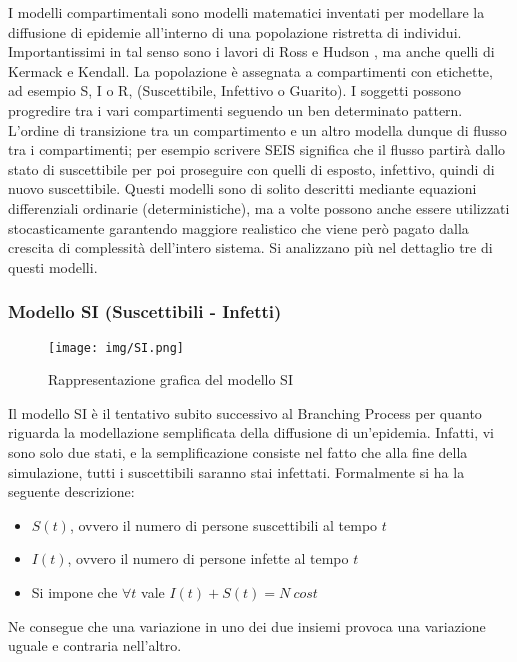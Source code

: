 \documentclass[12pt,twoside]{report}
\begin{document}
I modelli compartimentali sono modelli matematici inventati per modellare la diffusione di epidemie all'interno di una popolazione ristretta di individui. Importantissimi in tal senso sono i lavori di Ross e Hudson \cite{RossAnAO1}\cite{RossAnAO2}\cite{RossAnAO3}, ma anche quelli di Kermack\cite{KermackACT} e Kendall\cite{Kendall1956DeterministicAS}.
La popolazione è assegnata a compartimenti con etichette, ad esempio S, I o R, (Suscettibile, Infettivo o Guarito). I soggetti possono progredire tra i vari compartimenti seguendo un ben determinato pattern. L'ordine di transizione tra un compartimento e un altro modella dunque di flusso tra i compartimenti; per esempio scrivere SEIS significa che il flusso partirà dallo stato di suscettibile per poi proseguire con quelli di esposto, infettivo, quindi di nuovo suscettibile. Questi modelli sono di solito descritti mediante equazioni differenziali ordinarie (deterministiche), ma a volte possono anche essere utilizzati stocasticamente garantendo maggiore realistico che viene però pagato dalla crescita di complessità dell'intero sistema. Si analizzano più nel dettaglio tre di questi modelli.

\subsubsection{Modello SI (Suscettibili - Infetti)}
\begin{figure}[h]
		\centering
		\texttt{[image: img/SI.png]}
		\caption{Rappresentazione grafica del modello SI}\label{fig:1}
	\end{figure}
	
	Il modello SI è il tentativo subito successivo al Branching Process per quanto riguarda la modellazione semplificata della diffusione di un'epidemia. Infatti, vi sono solo due stati, e la semplificazione consiste nel fatto che alla fine della simulazione, tutti i suscettibili saranno stai infettati.
	Formalmente si ha la seguente descrizione:
	
	\begin{itemize}
	    \item $S(t)$, ovvero il numero di persone suscettibili al tempo $t$
	    \item $I(t)$, ovvero il numero di persone infette al tempo $t$
	    \item Si impone che $\forall t$ vale $I(t) + S(t) = N \ cost$
	\end{itemize}
	Ne consegue che una variazione in uno dei due insiemi provoca una variazione uguale e contraria nell'altro.
\end{document}
